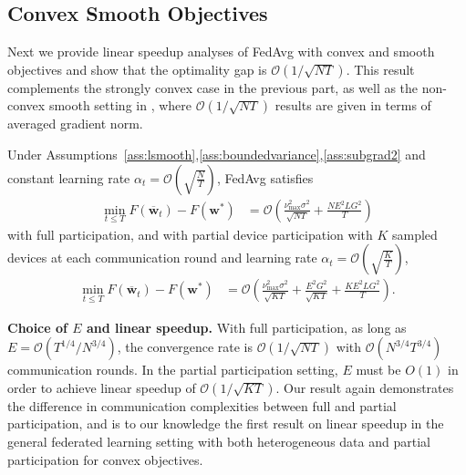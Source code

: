 \subsection{Convex Smooth Objectives}
Next we provide linear speedup analyses of FedAvg with convex and
smooth objectives and show that the optimality gap is $\mathcal{O}(1/\sqrt{NT})$. 
This result complements the strongly convex case in the previous part, as well as the non-convex
smooth setting in \cite{jiang2018linear,yu2019parallel,haddadpour2019convergence},
where $\mathcal{O}(1/\sqrt{NT})$ results are given in terms of averaged
gradient norm. 
\begin{theorem}
	\label{thm:SGD_cvx}Under Assumptions~\ref{ass:lsmooth},\ref{ass:boundedvariance},\ref{ass:subgrad2} and constant learning
	rate $\alpha_{t}=\mathcal{O}(\sqrt{\frac{N}{T}})$, FedAvg satisfies
	\begin{align*}
	\min_{t\leq T}F(\overline{\mathbf{w}}_{t})-F(\mathbf{w}^{\ast}) & =\mathcal{O}\left(\frac{\nu_{\max}^{2}\sigma^{2}}{\sqrt{NT}}+\frac{NE^{2}LG^{2}}{T}\right)
	\end{align*}
	with full participation, and with partial device participation with $K$ sampled devices at
	each communication round and learning rate $\alpha_{t}=\mathcal{O}(\sqrt{\frac{K}{T}})$,
	\begin{align*}
	\min_{t\leq T}F(\overline{\mathbf{w}}_{t})-F(\mathbf{w}^{\ast}) & =\mathcal{O}\left(\frac{\nu_{\max}^{2}\sigma^{2}}{\sqrt{KT}}+\frac{E^{2}G^{2}}{\sqrt{KT}}+\frac{KE^{2}LG^{2}}{T}\right).
	\end{align*}
\end{theorem}
%
\textbf{Choice of $E$ and linear speedup. }With full participation,
as long as $E=\mathcal{O}(T^{1/4}/N^{3/4})$, the convergence
rate is $\mathcal{O}(1/\sqrt{NT})$ with $\mathcal{O}(N^{3/4}T^{3/4})$
communication rounds. In the partial participation setting, $E$ must
be $O(1)$ in order to achieve linear speedup of $\mathcal{O}(1/\sqrt{KT})$.
Our result again demonstrates the difference in communication complexities
between full and partial participation, and is to our knowledge the
first result on linear speedup in the general federated learning setting
with both heterogeneous data and partial participation for convex objectives.
\begin{comment}
\textbf{Learning rate. }The learning rate now depends on the final
horizon $T$ of the convergence statement, whereas in the strongly
convex case the learning rate decays as $\mathcal{O}(1/t)$. Such
a requirement $\alpha_{t}=\mathcal{O}(\sqrt{N/T})$ also presents
in \cite{haddadpour2019convergence,yu2019parallel} on non-convex
problems with $\mathcal{O}(1/\sqrt{NT})$ linear speedup convergence results. 
\end{comment}